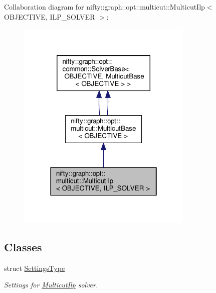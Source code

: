 Collaboration diagram for nifty\+:\+:graph\+:\+:opt\+:\+:multicut\+:\+:Multicut\+Ilp$<$ O\+B\+J\+E\+C\+T\+I\+VE, I\+L\+P\+\_\+\+S\+O\+L\+V\+ER $>$\+:
\nopagebreak
\begin{figure}[H]
\begin{center}
\leavevmode
\includegraphics[width=238pt]{classnifty_1_1graph_1_1opt_1_1multicut_1_1MulticutIlp__coll__graph}
\end{center}
\end{figure}
\subsection*{Classes}
\begin{DoxyCompactItemize}
\item 
struct \hyperlink{structnifty_1_1graph_1_1opt_1_1multicut_1_1MulticutIlp_1_1SettingsType}{Settings\+Type}
\begin{DoxyCompactList}\small\item\em Settings for \hyperlink{classnifty_1_1graph_1_1opt_1_1multicut_1_1MulticutIlp}{Multicut\+Ilp} solver. \end{DoxyCompactList}\end{DoxyCompactItemize}
